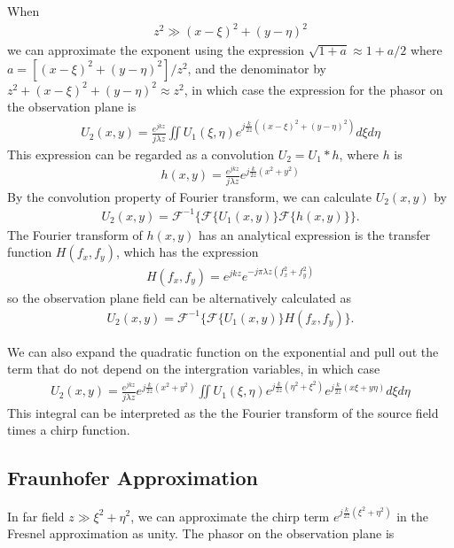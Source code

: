 \documentclass{revtex4-2}
\begin{document}
When
\begin{align}
    z^2 \gg (x-\xi)^2 + (y-\eta)^2
\end{align}
we can approximate the exponent using the expression $\sqrt{1 + a} \approx 1 + a/2$ where 
$a = [(x-\xi)^2 + (y-\eta)^2]/z^2$, and the denominator by $z^2 + (x-\xi)^2 + (y-\eta)^2 \approx z^2$, 
in which case the expression for the phasor on the observation plane is
\begin{align}
    U_2(x, y) = \frac{e^{jkz}}{j\lambda z} \iint U_1(\xi,\eta) e^{j\frac{k}{2z}((x-\xi)^2 + (y-\eta)^2)} d\xi d\eta
\end{align}
This expression can be regarded as a convolution $U_2 = U_1 * h$, where $h$ is
\begin{align}
    h(x, y) = \frac{e^{jkz}}{j\lambda z} e^{j\frac{k}{2z}(x^2 + y^2)}
\end{align}
By the convolution property of Fourier transform, we can calculate $U_2(x, y)$ by
\begin{align}
    \boxed{ U_2(x, y) = \mathcal{F}^{-1}\{ \mathcal{F}\{U_1(x, y)\} \mathcal{F}\{h(x, y)\} \}. }
\end{align}
The Fourier transform of $h(x, y)$ has an analytical expression is the transfer function $H(f_x, f_y)$,
which has the expression
\begin{align}
    H(f_x, f_y) = e^{jkz} e^{-j\pi\lambda z(f_x^2 + f_y^2)}
\end{align}
so the observation plane field can be alternatively calculated as
\begin{align}
    \boxed{ U_2(x, y) = \mathcal{F}^{-1}\{ \mathcal{F}\{U_1(x, y)\} H(f_x, f_y) \}. }
\end{align}

We can also expand the quadratic function on the exponential and pull out the term that do not
depend on the intergration variables, in which case
\begin{align}
    U_2(x, y) = \frac{e^{jkz}}{j\lambda z} e^{j\frac{k}{2z}(x^2+y^2)} 
    \iint U_1(\xi,\eta) e^{j\frac{k}{2z}(\eta^2+\xi^2)} e^{j\frac{k}{2z}(x\xi + y\eta)} d\xi d\eta
\end{align}
This integral can be interpreted as the the Fourier transform of the source field times a chirp function.

\subsection{Fraunhofer Approximation}

In far field $z \gg \xi^2 + \eta^2$, we can approximate the chirp term $e^{j\frac{k}{2z}(\xi^2 + \eta^2)}$ 
in the Fresnel approximation as unity. The phasor on the observation plane is
\end{document}
